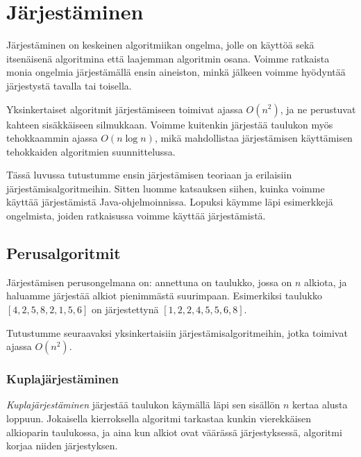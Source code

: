 \chapter{Järjestäminen}

Järjestäminen on keskeinen algoritmiikan ongelma,
jolle on käyttöä sekä itsenäisenä algoritmina että
laajemman algoritmin osana.
Voimme ratkaista monia ongelmia järjestämällä
ensin aineiston, minkä jälkeen voimme hyö\-dyntää
järjestystä tavalla tai toisella.

Yksinkertaiset algoritmit järjestämiseen toimivat
ajassa $O(n^2)$, ja ne perustuvat kahteen sisäkkäiseen
silmukkaan.
Voimme kuitenkin järjestää taulukon myös tehokkaammin
ajassa $O(n \log n)$, mikä mahdollistaa järjestämisen
käyttämisen tehokkaiden algoritmien suunnittelussa.

Tässä luvussa tutustumme ensin järjestämisen teoriaan
ja erilaisiin järjes\-tämisalgoritmeihin.
Sitten luomme katsauksen siihen, kuinka voimme
käyttää järjestämistä Java-ohjelmoinnissa.
Lopuksi käymme läpi esimerkkejä ongelmista,
joiden ratkaisussa voimme käyttää järjestämistä.

\section{Perusalgoritmit}

Järjestämisen perusongelmana on:
annettuna on taulukko, jossa on $n$ alkiota,
ja haluamme järjestää alkiot pienimmästä suurimpaan.
Esimerkiksi taulukko $[4,2,5,8,2,1,5,6]$ on
järjestettynä $[1,2,2,4,5,5,6,8]$.

Tutustumme seuraavaksi yksinkertaisiin järjestämisalgoritmeihin,
jotka toimivat ajassa $O(n^2)$.

\subsection{Kuplajärjestäminen}

\emph{Kuplajärjestäminen} järjestää taulukon käymällä läpi sen
sisällön $n$ kertaa alusta loppuun.
Jokaisella kierroksella algoritmi tarkastaa kunkin
vierekkäisen alkioparin taulukossa, ja aina kun alkiot ovat väärässä
järjestyksessä, algoritmi korjaa niiden järjestyksen.

